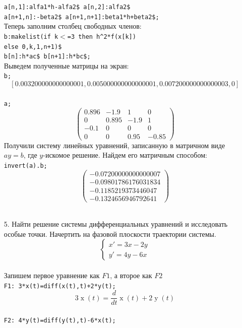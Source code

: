 \documentclass[article, bachelor, och, pract]{SCWorks}
\begin{document}
\begin{itemize}
\texttt{a[n,1]:alfa1*h-alfa2\$ a[n,2]:alfa2\$ \\
a[n+1,n]:-beta2\$ a[n+1,n+1]:beta1*h+beta2\$;}\\
Теперь заполним столбец свободных членов:\\
\texttt{b:makelist(if k\ensuremath{<}=3 then h\^{}2*f(x[k])\\
else 0,k,1,n+1)\$ \\
b[n]:h*ac\$ b[n+1]:h*bc\$;}\\
Выведем полученные матрицы на экран:\\
\texttt{b;}\\
\[[0.003200000000000001,0.005000000000000001,0.007200000000000003,0]\] \\
\texttt{a;}\\
$$\begin{pmatrix}
0.896 & -1.9 & 1 & 0\\
0 & 0.895 & -1.9 & 1\\
-0.1 & 0 & 0 & 0\\
0 & 0 & 0.95 & -0.85
\end{pmatrix}$$
Получили систему линейных уравнений, записанную в матричном виде \(ay=b\), где \(y\)-искомое решение. Найдем его матричным способом:\\
\texttt{invert(a).b;}\\
$$\begin{pmatrix}
-0.07200000000000007\\
-0.09801786176031834\\
-0.1185219373446047\\
-0.1324656946792641
\end{pmatrix}$$\\
\item[5.] Найти решение системы дифференциальных уравнений и исследовать особые точки. Начертить на фазовой плоскости траектории системы.\\
$$
\left\{
\begin{array}{l}
x'=3x-2y \\
y'=4y-6x
\end{array} \right. 
$$\\
Запишем первое уравнение как $F1$, а второе как $F2$\\
\texttt{F1: 3*x(t)=diff(x(t),t)+2*y(t);}\\
\[3\operatorname{x}(t)=\frac{d}{dt}\operatorname{x}(t)+2\operatorname{y}(t)\]
\\
\texttt{F2: 4*y(t)=diff(y(t),t)-6*x(t);}\\

\end{itemize}
\end{document}
